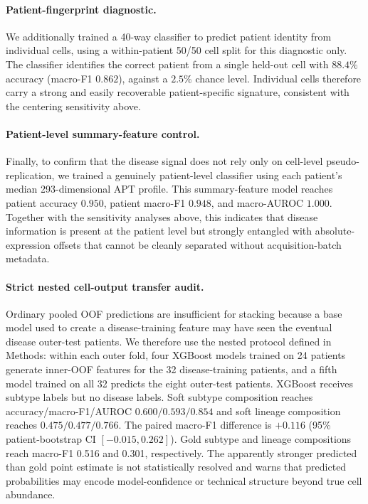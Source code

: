 \documentclass{article} %
\begin{document}
\paragraph{Patient-fingerprint diagnostic.}
We additionally trained a 40-way classifier to predict patient identity from individual cells, using a within-patient 50/50 cell split for this diagnostic only. The classifier identifies the correct patient from a single held-out cell with $88.4\%$ accuracy (macro-F1 $0.862$), against a $2.5\%$ chance level. Individual cells therefore carry a strong and easily recoverable patient-specific signature, consistent with the centering sensitivity above.

\paragraph{Patient-level summary-feature control.}
Finally, to confirm that the disease signal does not rely only on cell-level pseudo-replication, we trained a genuinely patient-level classifier using each patient's median 293-dimensional APT profile. This summary-feature model reaches patient accuracy $0.950$, patient macro-F1 $0.948$, and macro-AUROC $1.000$. Together with the sensitivity analyses above, this indicates that disease information is present at the patient level but strongly entangled with absolute-expression offsets that cannot be cleanly separated without acquisition-batch metadata.

\paragraph{Strict nested cell-output transfer audit.}
Ordinary pooled OOF predictions are insufficient for stacking because a base
model used to create a disease-training feature may have seen the eventual
disease outer-test patients. We therefore use the nested protocol defined in
Methods: within each outer fold, four XGBoost models trained on 24 patients
generate inner-OOF features for the 32 disease-training patients, and a fifth
model trained on all 32 predicts the eight outer-test patients. XGBoost receives
subtype labels but no disease labels. Soft subtype composition reaches
accuracy/macro-F1/AUROC $0.600/0.593/0.854$ and soft lineage composition reaches
$0.475/0.477/0.766$. The paired macro-F1 difference is $+0.116$ (95\%
patient-bootstrap CI $[-0.015,0.262]$). Gold subtype and lineage compositions
reach macro-F1 0.516 and 0.301, respectively. The apparently stronger predicted
than gold point estimate is not statistically resolved and warns that predicted
probabilities may encode model-confidence or technical structure beyond true
cell abundance.
\end{document}

